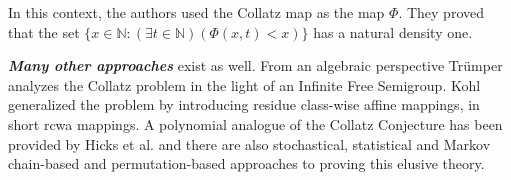 In this context, the authors used the Collatz map as the map $\Phi$. They proved that the set $\{x\in\mathbb{N}:(\exists t\in\mathbb{N})(\Phi(x,t)<x)\}$ has a natural density one.

\par\medskip
\textit{\textbf{Many other approaches}} exist as well. From an algebraic perspective Trümper \cite{Ref_Truemper_2014} analyzes the Collatz problem in the light of an Infinite Free Semigroup. Kohl \cite{Ref_Kohl_2008} generalized the problem by introducing residue class-wise affine mappings, in short rcwa mappings. A polynomial analogue of the Collatz Conjecture has been provided by Hicks et al. \cite{Ref_Hicks_Mullen_Yucas_Zavislak_2008} \cite{Ref_Snapp_Tracy_2008} and there are also stochastical, statistical and Markov chain-based and permutation-based approaches to proving this elusive theory.
